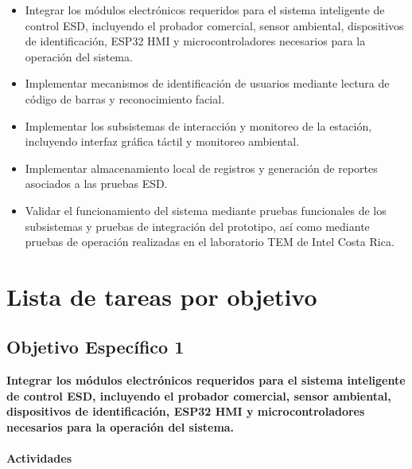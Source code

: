         \begin{itemize}

        \item Integrar los módulos electrónicos requeridos para el sistema inteligente de control ESD, incluyendo el 
        probador comercial, sensor ambiental, dispositivos de identificación, ESP32 HMI
         y microcontroladores necesarios para la operación del sistema.

        \item Implementar mecanismos de identificación de usuarios mediante lectura de código de barras y reconocimiento facial.

        \item Implementar los subsistemas de interacción y monitoreo de la estación, incluyendo interfaz gráfica 
        táctil y monitoreo ambiental.

        \item Implementar almacenamiento local de registros y generación de reportes asociados a las pruebas ESD.

        \item Validar el funcionamiento del sistema mediante pruebas funcionales de los subsistemas 
        y pruebas de integración del prototipo, así como mediante pruebas de operación realizadas 
        en el laboratorio TEM de Intel Costa Rica.

        \end{itemize}

\section{Lista de tareas por objetivo}

\subsection{Objetivo Específico 1}

\textbf{Integrar los módulos electrónicos requeridos para el sistema inteligente de 
control ESD, incluyendo el probador comercial, sensor ambiental, dispositivos de identificación, 
ESP32 HMI y microcontroladores necesarios para la operación del sistema.}

\paragraph{Actividades}

